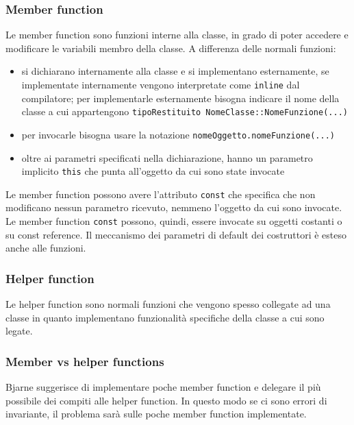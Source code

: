 \documentclass[a4paper]{article}
\begin{document}
\subsubsection*{Member function}
Le member function sono funzioni interne alla classe, in grado di poter accedere e modificare le variabili membro della classe.
A differenza delle normali funzioni:
\begin{itemize}
	\item si dichiarano internamente alla classe e si implementano esternamente, se implementate internamente vengono interpretate
	come \verb|inline| dal compilatore; per implementarle esternamente bisogna indicare il nome della classe a cui appartengono
	\verb|tipoRestituito NomeClasse::NomeFunzione(...)|
	\item per invocarle bisogna usare la notazione \verb|nomeOggetto.nomeFunzione(...)|
	\item oltre ai parametri specificati nella dichiarazione, hanno un parametro implicito \verb|this| che punta all'oggetto da
	cui sono state invocate
\end{itemize}
Le member function possono avere l'attributo \verb|const| che specifica che non modificano nessun parametro ricevuto, nemmeno
l'oggetto da cui sono invocate. Le member function \verb|const| possono, quindi, essere invocate su oggetti costanti o su const
reference. Il meccanismo dei parametri di default dei costruttori è esteso anche alle funzioni.

\subsubsection*{Helper function}
Le helper function sono normali funzioni che vengono spesso collegate ad una classe in quanto implementano funzionalità specifiche
della classe a cui sono legate.

\subsubsection*{Member vs helper functions}
Bjarne suggerisce di implementare poche member function e delegare il più possibile dei compiti alle helper function. In questo
modo se ci sono errori di invariante, il problema sarà sulle poche member function implementate.

\newpage
\end{document}
